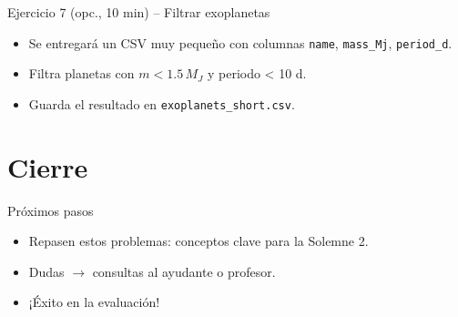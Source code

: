 \documentclass[10pt]{beamer}
\begin{document}
\begin{frame}[fragile]{Ejercicio 7 (opc., 10 min) – Filtrar exoplanetas}
\begin{itemize}
  \item Se entregará un CSV muy pequeño con columnas  
        \texttt{name}, \texttt{mass\_Mj}, \texttt{period\_d}.
  \item Filtra planetas con \(m < 1.5\,M_J\) y periodo < 10 d.
  \item Guarda el resultado en \texttt{exoplanets\_short.csv}.
\end{itemize}
\end{frame}

\section{Cierre}

\begin{frame}{Próximos pasos}
\begin{itemize}
  \item Repasen estos problemas: conceptos clave para la Solemne 2.
  \item Dudas $\longrightarrow$ consultas al ayudante o profesor.
  \item ¡Éxito en la evaluación!
\end{itemize}
\end{frame}
\end{document}
